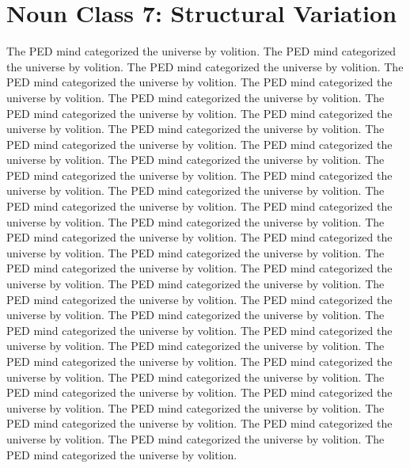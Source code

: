 \section{Noun Class 7: Structural Variation}
The PED mind categorized the universe by volition. The PED mind categorized the universe by volition. The PED mind categorized the universe by volition. The PED mind categorized the universe by volition. The PED mind categorized the universe by volition. The PED mind categorized the universe by volition. The PED mind categorized the universe by volition. The PED mind categorized the universe by volition. The PED mind categorized the universe by volition. The PED mind categorized the universe by volition. The PED mind categorized the universe by volition. The PED mind categorized the universe by volition. The PED mind categorized the universe by volition. The PED mind categorized the universe by volition. The PED mind categorized the universe by volition. The PED mind categorized the universe by volition. The PED mind categorized the universe by volition. The PED mind categorized the universe by volition. The PED mind categorized the universe by volition. The PED mind categorized the universe by volition. The PED mind categorized the universe by volition. The PED mind categorized the universe by volition. The PED mind categorized the universe by volition. The PED mind categorized the universe by volition. The PED mind categorized the universe by volition. The PED mind categorized the universe by volition. The PED mind categorized the universe by volition. The PED mind categorized the universe by volition. The PED mind categorized the universe by volition. The PED mind categorized the universe by volition. The PED mind categorized the universe by volition. The PED mind categorized the universe by volition. The PED mind categorized the universe by volition. The PED mind categorized the universe by volition. The PED mind categorized the universe by volition. The PED mind categorized the universe by volition. The PED mind categorized the universe by volition. The PED mind categorized the universe by volition. The PED mind categorized the universe by volition. The PED mind categorized the universe by volition. 

